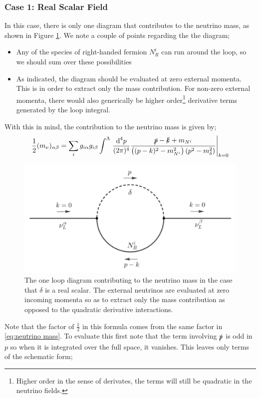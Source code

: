 \documentclass[10pt]{article}
\begin{document}
\subsubsection{Case 1: Real Scalar Field}
In this case, there is only one diagram that contributes to the neutrino mass, as shown in Figure \ref{fig:onelooprealdiag}. We note a couple of points regarding the the diagram;
\begin{itemize}
  \item Any of the species of right-handed fermion $N^i_R$ can run around the loop, so we should sum over these possibilities
  \item As indicated, the diagram should be evaluated at zero external momenta. This is in order to extract only the mass contribution. For non-zero external momenta, there would also generically be higher order\footnote{Higher order in the sense of derivates, the terms will still be quadratic in the neutrino fields.} derivative terms generated by the loop integral.
\end{itemize}
With this in mind, the contribution to the neutrino mass is given by;
\begin{dmath}\label{eq:oneloopmasseq}
  \frac{1}{2}(m_\nu)_{\alpha \beta} = \sum_{i}{g_{i\alpha}g_{i\beta}\int^{\Lambda}\left.{\frac{\ud^4 p}{(2\pi)^4}\frac{\slashed{p} - \slashed{k} + m_{N^i}}{\left((p - k)^2 - m_{N^i}^2\right)(p^2 - m_\delta^2)}}\right|_{k = 0}}
\end{dmath}
\begin{figure}
  \begin{framed}
  \centering
  \includegraphics[width=0.7\linewidth]{oneloopreal}
  \caption{The one loop diagram contributing to the neutrino mass in the case that $\delta$ is a real scalar. The external neutrinos are evaluated at zero incoming momenta so as to extract only the mass contribution as opposed to the quadratic derivative interactions.}
  \label{fig:onelooprealdiag}
  \end{framed}
\end{figure}
Note that the factor of $\tfrac{1}{2}$ in this formula comes from the same factor in \eqref{eq:neutrino mass}. To evaluate this first note that the term involving $\slashed{p}$ is odd in $p$ so when it is integrated over the full space, it vanishes. This leaves only terms of the schematic form;
\end{document}
